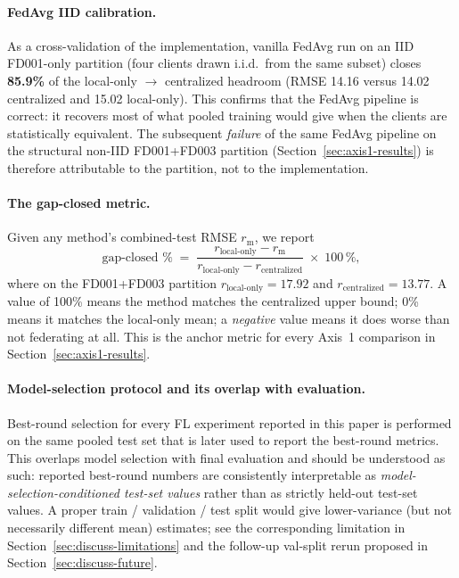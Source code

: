 \documentclass[a4paper,fleqn,doubleblind]{cas-sc}
\begin{document}
\paragraph{FedAvg IID calibration.}
As a cross-validation of the implementation, vanilla FedAvg run on
an IID FD001-only partition (four clients drawn i.i.d.\ from the
same subset) closes \textbf{85.9\%} of the local-only $\to$
centralized headroom (RMSE 14.16 versus 14.02 centralized and 15.02
local-only). This confirms that the FedAvg pipeline is correct: it
recovers most of what pooled training would give when the clients
are statistically equivalent. The subsequent \emph{failure} of the
same FedAvg pipeline on the structural non-IID FD001+FD003
partition (Section~\ref{sec:axis1-results}) is therefore
attributable to the partition, not to the implementation.

\paragraph{The gap-closed metric.}
Given any method's combined-test RMSE $r_{\mathrm{m}}$, we report
\begin{equation}
    \text{gap-closed \%}
    \;=\; \frac{r_{\text{local-only}} - r_{\mathrm{m}}}
                {r_{\text{local-only}} - r_{\text{centralized}}}
    \;\times\; 100\,\%,
    \label{eq:gap-closed}
\end{equation}
where on the FD001+FD003 partition
$r_{\text{local-only}} = 17.92$ and
$r_{\text{centralized}} = 13.77$. A value of 100\% means the method
matches the centralized upper bound; 0\% means it matches the
local-only mean; a \emph{negative} value means it does worse than
not federating at all. This is the anchor metric for every Axis~1
comparison in Section~\ref{sec:axis1-results}.

\paragraph{Model-selection protocol and its overlap with evaluation.}
Best-round selection for every FL experiment reported in this paper
is performed on the same pooled test set that is later used to
report the best-round metrics. This overlaps model selection with
final evaluation and should be understood as such: reported
best-round numbers are consistently interpretable as
\emph{model-selection-conditioned test-set values} rather than as
strictly held-out test-set values. A proper train / validation /
test split would give lower-variance (but not necessarily different
mean) estimates; see the corresponding limitation in
Section~\ref{sec:discuss-limitations} and the follow-up val-split
rerun proposed in Section~\ref{sec:discuss-future}.
\end{document}
